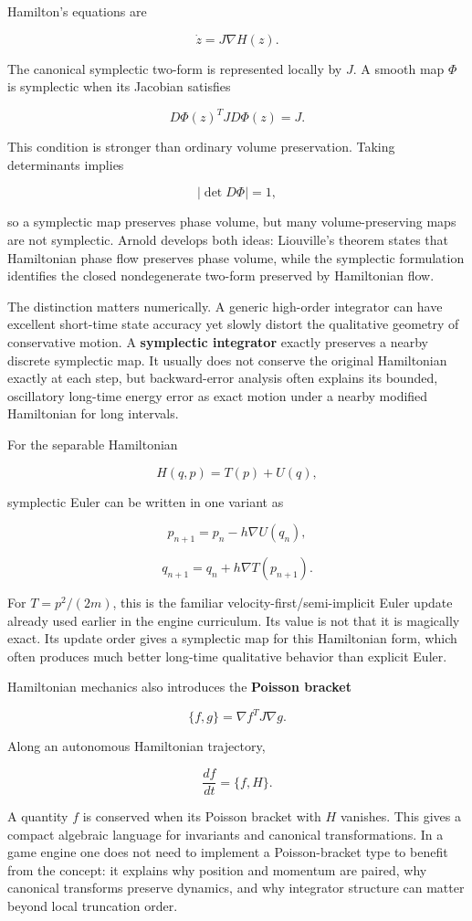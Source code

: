Hamilton's equations are

\[
\dot z
=
J\nabla H(z).
\]

The canonical symplectic two-form is represented locally by \(J\). A smooth map \(\Phi\) is symplectic when its Jacobian satisfies

\[
D\Phi(z)^T J D\Phi(z)=J.
\]

This condition is stronger than ordinary volume preservation. Taking determinants implies

\[
|\det D\Phi|=1,
\]

so a symplectic map preserves phase volume, but many volume-preserving maps are not symplectic. Arnold develops both ideas: Liouville's theorem states that Hamiltonian phase flow preserves phase volume, while the symplectic formulation identifies the closed nondegenerate two-form preserved by Hamiltonian flow.

The distinction matters numerically. A generic high-order integrator can have excellent short-time state accuracy yet slowly distort the qualitative geometry of conservative motion. A \textbf{symplectic integrator} exactly preserves a nearby discrete symplectic map. It usually does not conserve the original Hamiltonian exactly at each step, but backward-error analysis often explains its bounded, oscillatory long-time energy error as exact motion under a nearby modified Hamiltonian for long intervals.

For the separable Hamiltonian

\[
H(q,p)=T(p)+U(q),
\]

symplectic Euler can be written in one variant as

\[
p_{n+1}
=
p_n-h\nabla U(q_n),
\]

\[
q_{n+1}
=
q_n+h\nabla T(p_{n+1}).
\]

For \(T=p^2/(2m)\), this is the familiar velocity-first/semi-implicit Euler update already used earlier in the engine curriculum. Its value is not that it is magically exact. Its update order gives a symplectic map for this Hamiltonian form, which often produces much better long-time qualitative behavior than explicit Euler.

Hamiltonian mechanics also introduces the \textbf{Poisson bracket}

\[
\{f,g\}
=
\nabla f^T J\nabla g.
\]

Along an autonomous Hamiltonian trajectory,

\[
\frac{df}{dt}
=
\{f,H\}.
\]

A quantity \(f\) is conserved when its Poisson bracket with \(H\) vanishes. This gives a compact algebraic language for invariants and canonical transformations. In a game engine one does not need to implement a Poisson-bracket type to benefit from the concept: it explains why position and momentum are paired, why canonical transforms preserve dynamics, and why integrator structure can matter beyond local truncation order.

